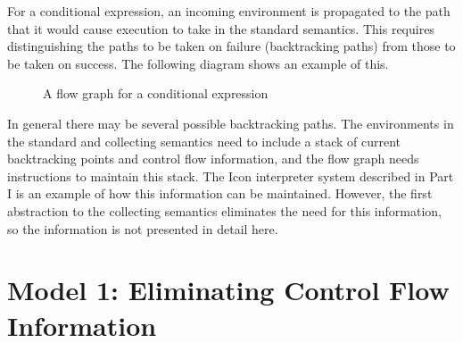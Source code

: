 For a conditional expression, an incoming environment is propagated to
the path that it would cause execution to take in the standard
semantics. This requires distinguishing the paths to be taken on
failure (backtracking paths) from those to be taken on success. The
following diagram shows an example of this.


\begin{figure}[htb]
\begin{center}
\end{center}
\caption{A flow graph for a conditional expression}
\end{figure}

In general there may be several possible backtracking paths. The
environments in the standard and collecting semantics need to include
a stack of current backtracking points and control flow information,
and the flow graph needs instructions to maintain this stack. The Icon
interpreter system described in Part I is an example of how this
information can be maintained. However, the first abstraction to the
collecting semantics eliminates the need for this information, so the
information is not presented in detail here.

\section*{Model 1: Eliminating Control Flow Information}

